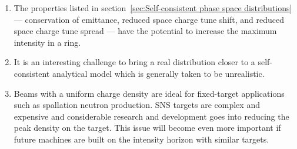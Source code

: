 \begin{enumerate}
\item 
The properties listed in section~\ref{sec:Self-consistent phase space distributions} — conservation of emittance, reduced space charge tune shift, and reduced space charge tune spread — have the potential to increase the maximum intensity in a ring.

\item
It is an interesting challenge to bring a real distribution closer to a self-consistent analytical model which is generally taken to be unrealistic. 

\item
Beams with a uniform charge density are ideal for fixed-target applications such as spallation neutron production. SNS targets are complex and expensive \cite{Haines2014} and considerable research and development goes into reducing the peak density on the target. This issue will become even more important if future machines are built on the intensity horizon with similar targets.


\end{enumerate}
